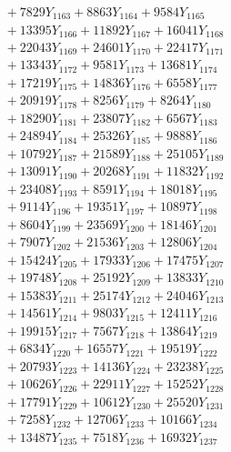 \documentclass[a4paper,10pt]{article}
\begin{document}
{\begin{align}
&\;  + 7829 Y_{1163} + 8863 Y_{1164} + 9584 Y_{1165} \\[0.3ex]
&\;  + 13395 Y_{1166} + 11892 Y_{1167} + 16041 Y_{1168} \\[0.5ex]\allowbreak
&\;  + 22043 Y_{1169} + 24601 Y_{1170} + 22417 Y_{1171} \\[0.3ex]
&\;  + 13343 Y_{1172} + 9581 Y_{1173} + 13681 Y_{1174} \\[0.3ex]
&\;  + 17219 Y_{1175} + 14836 Y_{1176} + 6558 Y_{1177} \\[0.3ex]
&\;  + 20919 Y_{1178} + 8256 Y_{1179} + 8264 Y_{1180} \\[0.3ex]
&\;  + 18290 Y_{1181} + 23807 Y_{1182} + 6567 Y_{1183} \\[0.3ex]
&\;  + 24894 Y_{1184} + 25326 Y_{1185} + 9888 Y_{1186} \\[0.3ex]
&\;  + 10792 Y_{1187} + 21589 Y_{1188} + 25105 Y_{1189} \\[0.3ex]
&\;  + 13091 Y_{1190} + 20268 Y_{1191} + 11832 Y_{1192} \\[0.3ex]
&\;  + 23408 Y_{1193} + 8591 Y_{1194} + 18018 Y_{1195} \\[0.3ex]
&\;  + 9114 Y_{1196} + 19351 Y_{1197} + 10897 Y_{1198} \\[0.5ex]\allowbreak
&\;  + 8604 Y_{1199} + 23569 Y_{1200} + 18146 Y_{1201} \\[0.3ex]
&\;  + 7907 Y_{1202} + 21536 Y_{1203} + 12806 Y_{1204} \\[0.3ex]
&\;  + 15424 Y_{1205} + 17933 Y_{1206} + 17475 Y_{1207} \\[0.3ex]
&\;  + 19748 Y_{1208} + 25192 Y_{1209} + 13833 Y_{1210} \\[0.3ex]
&\;  + 15383 Y_{1211} + 25174 Y_{1212} + 24046 Y_{1213} \\[0.3ex]
&\;  + 14561 Y_{1214} + 9803 Y_{1215} + 12411 Y_{1216} \\[0.3ex]
&\;  + 19915 Y_{1217} + 7567 Y_{1218} + 13864 Y_{1219} \\[0.3ex]
&\;  + 6834 Y_{1220} + 16557 Y_{1221} + 19519 Y_{1222} \\[0.3ex]
&\;  + 20793 Y_{1223} + 14136 Y_{1224} + 23238 Y_{1225} \\[0.3ex]
&\;  + 10626 Y_{1226} + 22911 Y_{1227} + 15252 Y_{1228} \\[0.5ex]\allowbreak
&\;  + 17791 Y_{1229} + 10612 Y_{1230} + 25520 Y_{1231} \\[0.3ex]
&\;  + 7258 Y_{1232} + 12706 Y_{1233} + 10166 Y_{1234} \\[0.3ex]
&\;  + 13487 Y_{1235} + 7518 Y_{1236} + 16932 Y_{1237} \\[0.3ex]

\end{align}}
\end{document}
